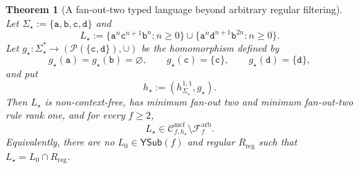 \documentclass[11pt]{article}
\numberwithin{equation}{section}
\theoremstyle{plain}
\newtheorem{theorem}{Theorem}[section]
\theoremstyle{definition}
\theoremstyle{remark}
\newcommand{\Cmcf}[2]{\mathcal{C}^{\mathrm{mcf}}_{#1,#2}}
\newcommand{\YSub}[1]{\mathsf{YSub}(#1)}
\begin{document}
\begin{theorem}[A fan-out-two typed language beyond arbitrary regular filtering]
\label{thm:arbitrary-filter-separation}
Let $\Sigma_\star:=\{\mathtt a,\mathtt b,\mathtt c,\mathtt d\}$ and
\[
 L_\star
 :=\{\mathtt a^n\mathtt c^{n+1}\mathtt b^n:n\ge0\}
   \cup
   \{\mathtt a^n\mathtt d^{n+1}\mathtt b^{2n}:n\ge0\}.
\]
Let
$g_\star:\Sigma_\star^*\to(\mathcal P(\{\mathtt c,\mathtt d\}),\cup)$
be the homomorphism defined by
\[
 g_\star(\mathtt a)=g_\star(\mathtt b)=\varnothing,
 \qquad
 g_\star(\mathtt c)=\{\mathtt c\},
 \qquad
 g_\star(\mathtt d)=\{\mathtt d\},
\]
and put
\[
 h_\star:=(h_{\Sigma_\star}^{1,1},g_\star).
\]
Then $L_\star$ is non-context-free, has minimum fan-out two and minimum
fan-out-two rule rank one, and for every $f\ge2$,
\[
  L_\star\in\Cmcf{f}{h_\star}
  \setminus\mathcal F_f^{\mathrm{arb}}.
\]
Equivalently, there are no $L_0\in\YSub{f}$ and regular $R_{\mathrm{reg}}$ such that
$L_\star=L_0\cap R_{\mathrm{reg}}$.
\end{theorem}
\end{document}
